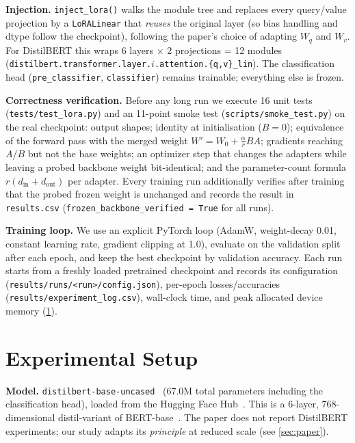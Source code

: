 \documentclass[conference]{IEEEtran}
\begin{document}
\textbf{Injection.} \texttt{inject\_lora()} walks the module tree and replaces
every query/value projection by a \texttt{LoRALinear} that \emph{reuses} the
original layer (so bias handling and dtype follow the checkpoint), following
the paper's choice of adapting $W_q$ and $W_v$. For DistilBERT this wraps 6
layers $\times$ 2 projections = 12 modules
(\texttt{distilbert.transformer.layer.$i$.attention.\{q,v\}\_lin}). The
classification head (\texttt{pre\_classifier}, \texttt{classifier}) remains
trainable; everything else is frozen.

\textbf{Correctness verification.} Before any long run we execute 16 unit tests
(\texttt{tests/test\_lora.py}) and an 11-point smoke test
(\texttt{scripts/smoke\_test.py}) on the real checkpoint: output shapes;
identity at initialisation ($B{=}0$); equivalence of the forward pass with the
merged weight $W' = W_0 + \frac{\alpha}{r}BA$; gradients reaching $A$/$B$ but
not the base weights; an optimizer step that changes the adapters while leaving
a probed backbone weight bit-identical; and the parameter-count formula
$r(d_{\text{in}}+d_{\text{out}})$ per adapter. Every training run additionally
verifies after training that the probed frozen weight is unchanged and records
the result in \texttt{results.csv}
(\texttt{frozen\_backbone\_verified = True} for all runs).

\textbf{Training loop.} We use an explicit PyTorch loop (AdamW,
weight-decay 0.01, constant learning rate, gradient clipping at 1.0), evaluate
on the validation split after each epoch, and keep the best checkpoint by
validation accuracy. Each run starts from a freshly loaded pretrained
checkpoint and records its configuration
(\texttt{results/runs/<run>/config.json}), per-epoch losses/accuracies
(\texttt{results/experiment\_log.csv}), wall-clock time, and peak allocated
device memory (\cref{sec:setup}).

\section{Experimental Setup}
\label{sec:setup}
\textbf{Model.} \texttt{distilbert-base-uncased}~\cite{sanh2019distilbert}
(67.0M total parameters including the classification head), loaded from the
Hugging Face Hub~\cite{wolf2020transformers}. This is a 6-layer, 768-dimensional
distil-variant of BERT-base~\cite{devlin2019bert}. The paper does not report
DistilBERT experiments; our study adapts its \emph{principle} at reduced scale
(see \cref{sec:paper}).
\end{document}
